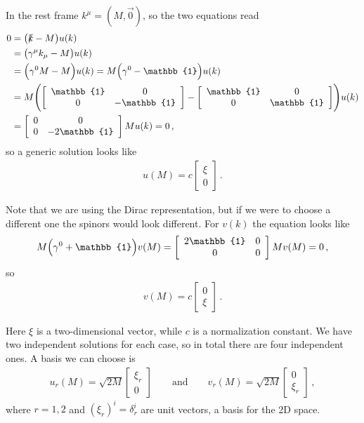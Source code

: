 \documentclass[main.tex]{subfiles}
\begin{document}
In the rest frame \(k^{\mu } = (M, \vec{0})\), so the two equations read 
%
\begin{align}
0&= \qty(\slashed{k} - M) u(k)  \\
&= \qty(\gamma^{\mu }k_{\mu } - M) u(k)  \\
&= \qty(\gamma^{0} M - M ) u(k) = M \qty(\gamma^{0} - \mathbb{1}) u(k)  \\
&=M\qty( \left[\begin{array}{cc}
\mathbb{1} & 0 \\ 
0 & -\mathbb{1}
\end{array}\right] 
-
\left[\begin{array}{cc}
\mathbb{1} & 0 \\ 
0 & \mathbb{1}
\end{array}\right]
) u(k)  \\
&= \left[\begin{array}{cc}
0 & 0 \\ 
0 & -2 \mathbb{1}
\end{array}\right] M u(k) =0
\,,
\end{align}
%
so a generic solution looks like 
%
\begin{align}
u(M) = c \left[\begin{array}{c}
\xi  \\ 
0
\end{array}\right]
\,.
\end{align}

Note that we are using the Dirac representation, but if we were to choose a different one the spinors would look different. 
For \(v(k)\) the equation looks like 
%
\begin{align}
M \qty(\gamma^{0} + \mathbb{1}) v(M) =
\left[\begin{array}{cc}
2 \mathbb{1} & 0 \\ 
0 & 0
\end{array}\right] M v(M) = 0
\,,
\end{align}
%
so 
%
\begin{align}
v(M) = c \left[\begin{array}{c}
0 \\ 
\xi 
\end{array}\right]
\,.
\end{align}

Here \(\xi \) is a two-dimensional vector, while \(c\) is a normalization constant. 
We have two independent solutions for each case, so in total there are four independent ones. 
A basis we can choose is 
%
\begin{align}
u_{r} (M) = \sqrt{2M} \left[\begin{array}{c}
\xi_{r} \\ 
0
\end{array}\right]
\qquad \text{and} \qquad
v_{r} (M) = \sqrt{2M} \left[\begin{array}{c}
0 \\
\xi_{r} 
\end{array}\right]
\,,
\end{align}
%
where \(r=1,2\) and \((\xi_{r})^{i} = \delta^{i}_{r}\) are unit vectors, a basis for the 2D space. 
\end{document}
